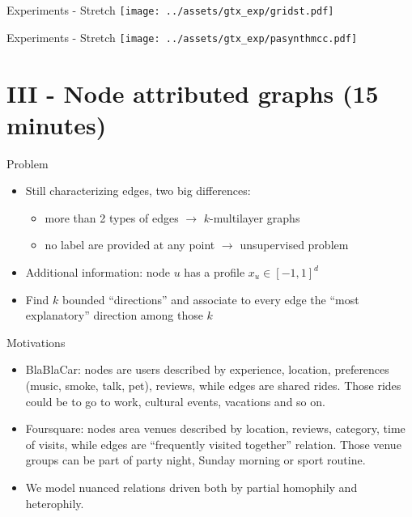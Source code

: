 \documentclass[10pt,svgnames,ignorenonframetext,final]{beamer}
\providecommand{\tightlist}{%
  \setlength{\itemsep}{0pt}\setlength{\parskip}{0pt}}
\begin{document}
\begin{frame}{Experiments - Stretch}
\texttt{[image: ../assets/gtx\_exp/gridst.pdf]}
\end{frame}

\begin{frame}{Experiments - Stretch}
\texttt{[image: ../assets/gtx\_exp/pasynthmcc.pdf]}
\end{frame}


\section{III - Node attributed graphs (15 minutes)}
\label{iii---node-attributed-graphs-15-minutes}

\begin{frame}{Problem}
\protect\hypertarget{problem}{}

\begin{itemize}
\item
  Still characterizing edges, two big differences:

  \begin{itemize}
  \tightlist
  \item
    more than 2 types of edges \(\rightarrow\) \(k\)-multilayer graphs
  \item
    no label are provided at any point \(\rightarrow\) unsupervised
    problem
  \end{itemize}
\item
  Additional information: node \(u\) has a profile \(x_u \in [-1, 1]^d\)
\item
  Find \(k\) bounded “directions” and associate to every edge the “most
  explanatory” direction among those \(k\)
\end{itemize}

\end{frame}

\begin{frame}{Motivations}
\protect\hypertarget{motivations}{}

\begin{itemize}
\item
  BlaBlaCar: nodes are users described by experience, location,
  preferences (music, smoke, talk, pet), reviews, while edges are shared
  rides. Those rides could be to go to work, cultural events, vacations
  and so on.
\item
  Foursquare: nodes area venues described by location, reviews,
  category, time of visits, while edges are “frequently visited
  together” relation. Those venue groups can be part of party night,
  Sunday morning or sport routine.
\item
  We model nuanced relations driven both by partial homophily and
  heterophily.
\end{itemize}

\end{frame}
\end{document}
